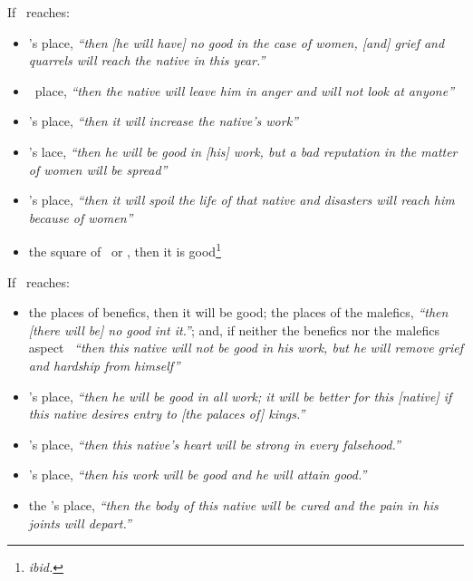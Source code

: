 If  \Venus\, reaches:
\begin{itemize}[topsep=0em,itemsep=0em]
\item  \Jupiter's place, \textsl{``then [he will have] no good in the case of women, [and] grief and quarrels will reach the native in this year.''}

\item \Mars\, place, \textsl{``then the native will leave him in anger and will not look at anyone''}

\item \Mercury's place, \textsl{``then it will increase the native's work''}

\item \Moon's lace, \textsl{``then he will be good in [his] work, but a bad reputation in the matter of women will be spread''}

\item \Sun's place, \textsl{``then it will spoil the life of that native and disasters will reach him because of women''}

\item the square of \Mars\, or \Saturn, then it is good\footnote{\textsl{ibid.}}
\end{itemize}

If  \Mercury\, reaches:
\begin{itemize}[topsep=0em,itemsep=0em]
\item the places of benefics, then it will be good; the places of the malefics, \textsl{``then [there will be] no good int it.''}; and, if neither the benefics nor the malefics aspect \Mercury\, \textsl{``then this native will not be good in his work, but he will remove grief and hardship from himself''}

\item \Jupiter's place, \textsl{``then he will be good in all work; it will be better for this [native] if this native desires entry to [the palaces of] kings.''}

\item \Mars's place, \textsl{``then this native's heart will be strong in every falsehood.''}

\item \Venus's place, \textsl{``then his work will be good and he will attain good.''}

\item the \Moon's place, \textsl{``then the body of this native will be cured and the pain in his joints will depart.''}
\end{itemize}



